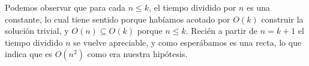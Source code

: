 \begin{figure}[H]
    \begin{minipage}[t]{\linewidth}
		\centering
		\label{fig:ejercicio_3_complejidad_dividida_n}
    \end{minipage}
\end{figure}

Podemos observar que para cada $n \leq k$, el tiempo dividido por $n$ es una constante, lo cual tiene sentido porque habíamos acotado por $O(k)$ construir la solución trivial, y $O(n) \subseteq O(k)$ porque $n \leq k$. Recién a partir de $n = k+1$ el tiempo dividido $n$ se vuelve apreciable, y como esperábamos es una recta, lo que indica que es $O(n^2)$ como era nuestra hipótesis.

